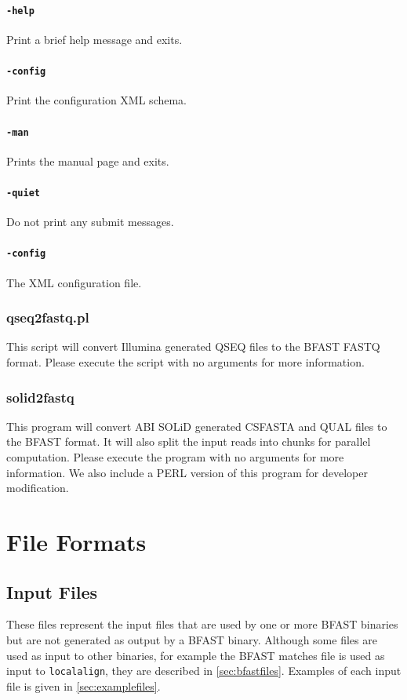 \documentclass[a4paper,12pt]{book}
\newcommand{\TT}[1]{{\tt #1}} %
\newcommand{\BMF}{BFAST matches file} %
\begin{document}
\subsubsection{\TT{-help}}
Print a brief help message and exits.
\subsubsection{\TT{-config}}
Print the configuration XML schema.
\subsubsection{\TT{-man}}
Prints the manual page and exits.
\subsubsection{\TT{-quiet}}
Do not print any submit messages.
\subsubsection{\TT{-config}}
The XML configuration file.
\subsection{qseq2fastq.pl}
This script will convert Illumina generated QSEQ files to the BFAST FASTQ format.
Please execute the script with no arguments for more information.
\subsection{solid2fastq}
This program will convert ABI SOLiD generated CSFASTA and QUAL files to the BFAST format.
It will also split the input reads into chunks for parallel computation.
Please execute the program with no arguments for more information.
We also include a PERL version of this program for developer modification.
\chapter{File Formats}
\section{Input Files}
\label{sec:inputfiles}
These files represent the input files that are used by one or more BFAST binaries but are not generated as output by a BFAST binary.
Although some files are used as input to other binaries, for example the \BMF{} is used as input to \TT{localalign}, they are described in \autoref{sec:bfastfiles}.
Examples of each input file is given in \autoref{sec:examplefiles}.
\end{document}
